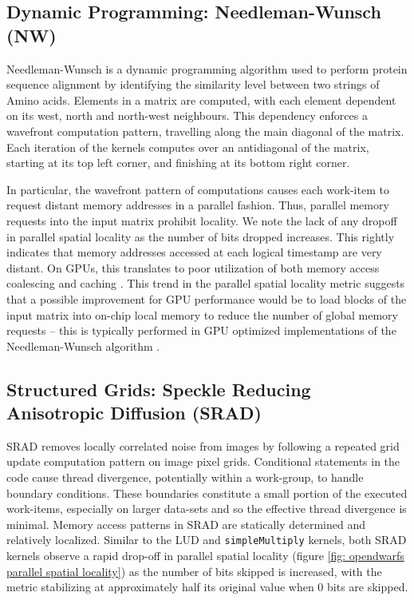 \documentclass[review=false, sigchi]{acmart}
\begin{document}
	\subsection{Dynamic Programming: Needleman-Wunsch (NW)}
	
	Needleman-Wunsch is a dynamic programming algorithm used to perform protein sequence alignment by identifying the similarity level between two strings of Amino acids. Elements in a matrix are computed, with each element dependent on its west, north and north-west neighbours. This dependency enforces a wavefront computation pattern, travelling along the main diagonal of the matrix. Each iteration of the kernels computes over an antidiagonal of the matrix, starting at its top left corner, and finishing at its bottom right corner.
	
	In particular, the wavefront pattern of computations causes each work-item to request distant memory addresses in a parallel fashion. Thus, parallel memory requests into the input matrix prohibit locality. We note the lack of any dropoff in parallel spatial locality as the number of bits dropped increases. This rightly indicates that memory addresses accessed at each logical timestamp are very distant. On GPUs, this translates to poor utilization of both memory access coalescing and caching \cite{krommydas2016opendwarfs}. This trend in the parallel spatial locality metric suggests that a possible improvement for GPU performance would be to load blocks of the input matrix into on-chip local memory to reduce the number of global memory requests -- this is typically performed in GPU optimized implementations of the Needleman-Wunsch algorithm \cite{opendwarfs2020head}. 
	
	\subsection{Structured Grids: Speckle Reducing Anisotropic Diffusion (SRAD)}
	
	SRAD removes locally correlated noise from images by following a repeated grid update computation pattern on image pixel grids. 
	Conditional statements in the code cause thread divergence, potentially within a work-group, to handle boundary conditions. 
	These boundaries constitute a small portion of the executed work-items, especially on larger data-sets and so the effective thread divergence is minimal.
	Memory access patterns in SRAD are statically determined and relatively localized. 
	Similar to the LUD and \texttt{simpleMultiply} kernels, both SRAD kernels observe a rapid drop-off in parallel spatial locality (figure \ref{fig: opendwarfs parallel spatial locality}) as the number of bits skipped is increased, with the metric stabilizing at approximately half its original value when 0 bits are skipped.
	
\end{document}
